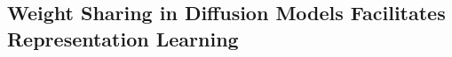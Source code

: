 
\subsection{Weight Sharing in Diffusion Models Facilitates Representation Learning}\label{subsec:weight_share}

